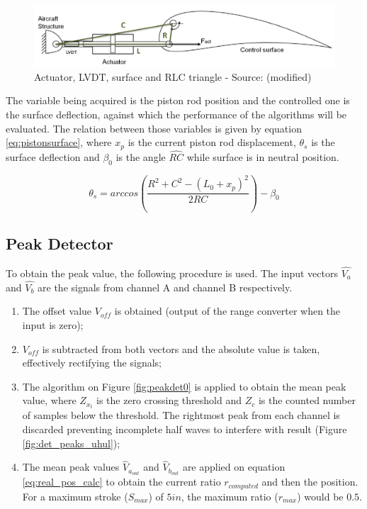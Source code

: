 \documentclass[conference]{IEEEtran}
\begin{document}
\begin{figure}[h!]
\centering
\includegraphics[scale=0.2]{pics/demodalg/actuator_and_surface.png}
\caption{Actuator, LVDT, surface and RLC triangle - Source: \cite{Ballesteros} (modified)}
\label{fig:actuator_and_surface}
\end{figure}

The variable being acquired is the piston rod position and the controlled one is the surface deflection, against which the performance of the algorithms will be evaluated. The relation between those variables is given by equation \ref{eq:pistonsurface}, where $x_p$ is the current piston rod displacement, $\theta_s$ is the surface deflection and $\beta_0$ is the angle $\widehat{RC}$ while surface is in neutral position.

\begin{equation}
\theta_s = arccos \left( \frac{R^2 + C^2 - (L_0+x_p)^2}{2RC} \right) - \beta_0
\label{eq:pistonsurface}
\end{equation}

\subsection{Peak Detector}

To obtain the peak value, the following procedure is used. The input vectors $\hat{V_a}$ and $\hat{V_b}$ are the signals from channel A and channel B respectively.

\begin{enumerate}
\item The offset value $V_{off}$ is obtained (output of the range converter when the input is zero);
\item $V_{off}$ is subtracted from both vectors and the absolute value is taken, effectively rectifying the signals;
\item The algorithm on Figure \ref{fig:peakdet0} is applied to obtain the mean peak value, where $Z_{x_t}$ is the zero crossing threshold and $Z_c$ is the counted number of samples below the threshold. The rightmost peak from each channel is discarded preventing incomplete half waves to interfere with result (Figure \ref{fig:det_peaks_uhul});
\item The mean peak values $\hat{V}_{a_{out}}$ and $\hat{V}_{b_{out}}$ are applied on equation \ref{eq:real_pos_calc} to obtain the current ratio $r_{computed}$ and then the position. For a maximum stroke ($S_{max}$) of $5in$, the maximum ratio ($r_{max}$) would be $0.5$.
\end{enumerate}
\end{document}
